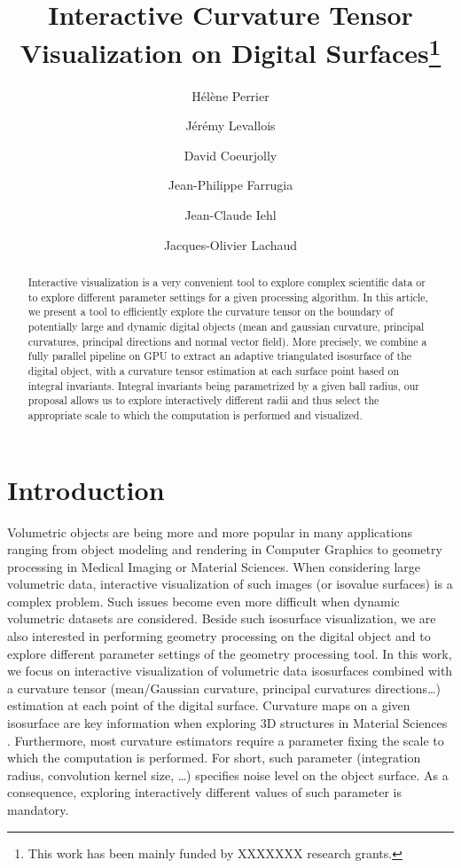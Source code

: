 \documentclass{llncs}
\title{Interactive Curvature Tensor Visualization on Digital
Surfaces\thanks{This work has been mainly funded by XXXXXXX research grants.}}
\author{H\'el\`ene Perrier\inst{1}\and J\'er\'emy Levallois\inst{1,2}\and David
Coeurjolly\inst{1}\and Jean-Philippe Farrugia\inst{1}\and Jean-Claude
Iehl\inst{1}\and Jacques-Olivier Lachaud\inst{2} }
\institute{ Universit\'e de Lyon, CNRS\\
   LIRIS, UMR5205, F-69621, France
   \and
Universit\'e de Savoie, CNRS\\
LAMA, UMR5127, F-73776, France\\
}
\begin{document}
\maketitle


\begin{abstract}\sloppy
  Interactive visualization is a very convenient tool to explore
  complex scientific data or to explore different parameter settings
  for a given processing algorithm. In this article, we present a tool
  to efficiently explore the curvature tensor on the boundary of
  potentially large and dynamic digital objects (mean and gaussian curvature,
  principal curvatures, principal directions and normal vector
  field). More precisely, we combine a fully parallel pipeline on GPU
  to extract an adaptive triangulated isosurface of the digital
  object, with a curvature tensor estimation at each surface point
  based on integral invariants. Integral invariants being parametrized
  by a given ball radius, our proposal allows us to explore
  interactively different radii and thus select the appropriate scale
  to which the computation is performed and visualized.


\end{abstract}

\section{Introduction}
\label{sec:introduction}

Volumetric objects are being more and more popular in many
applications ranging from object modeling and rendering in Computer
Graphics to geometry processing in Medical Imaging or Material
Sciences. When considering large volumetric data, interactive
visualization of such images (or isovalue surfaces) is a complex
problem. Such issues become even more difficult when dynamic
volumetric datasets are considered. Beside such isosurface
visualization, we are also interested in performing geometry
processing on the digital object and to explore different parameter
settings of the geometry processing tool.  In this work, we focus on
interactive visualization of volumetric data isosurfaces combined with
a curvature tensor (mean/Gaussian curvature, principal curvatures
directions\ldots) estimation at each point of the digital
surface. Curvature maps on a given isosurface are key information when
exploring 3D structures in Material Sciences . Furthermore,
most curvature estimators require a parameter fixing the scale
to which the computation is performed. For short, such parameter
(integration radius, convolution kernel size, \ldots) specifies noise
level on the object surface. As a consequence, exploring interactively
different values of such parameter is mandatory.
\vspace{0.2cm}
\end{document}
